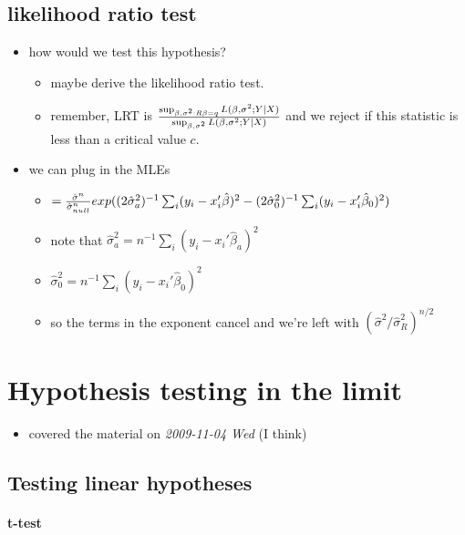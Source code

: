\subsection{likelihood ratio test}

\begin{itemize}
\item how would we test this hypothesis?
\begin{itemize}
\item maybe derive the likelihood ratio test.
\item remember, LRT is ${\sup_{\beta, \sigma^2: R\beta = q} L(\beta,
         \sigma^2; Y \mid X) \over \sup_{\beta, \sigma^2} L(\beta,
         \sigma^2; Y \mid X)}$ and we reject if this statistic is less
         than a critical value $c$.
\end{itemize}
\item we can plug in the MLEs
\begin{itemize}
\item $= {\hat\sigma^n \over \hat\sigma^n_{null}}
         exp((2\hat\sigma^2_a)^{-1} \sum_i (y_i -
         x_i'\hat\beta)^2 - (2\hat\sigma^2_0)^{-1} \sum_i (y_i - x_i'\hat\beta_0)^2)$
\item note that $\hat\sigma^2_a = n^{-1} \sum_i (y_i -
         x_i'\hat\beta_a)^2$
\item $\hat\sigma^2_0 = n^{-1} \sum_i (y_i - x_i'\hat\beta_0)^2$
\item so the terms in the exponent cancel and we're left with
         $(\hat\sigma^2 / \hat\sigma^2_R)^{n/2}$
\end{itemize}
\end{itemize}

\section{Hypothesis testing in the limit}

\begin{itemize}
\item covered the material on \textit{2009-11-04 Wed} (I think)
\end{itemize}

\subsection{Testing linear hypotheses}

\paragraph{t-test}

